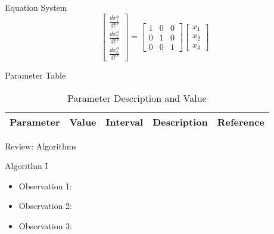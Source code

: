 \begin{frame}[t]
\begin{columns}[t]
\begin{column}{\onecolwid}
\begin{alertblock}{Equation System}
\begin{equation}
\begin{bmatrix} 
	\frac{dx_{1}^{\alpha}}{dt^{\alpha}}\\ 
	\frac{dx_{2}^{\alpha}}{dt^{\alpha}}\\ 
	\frac{dx_{3}^{\alpha}}{dt^{\alpha}}
\end{bmatrix} = 
\begin{bmatrix}
1 & 0 & 0\\ 
0 & 1 & 0\\ 
0 & 0 & 1
\end{bmatrix} 
\begin{bmatrix} 
	x_{1}\\ 
	x_{2}\\ 
	x_{3}
\end{bmatrix}
\end{equation}


\end{alertblock}
\begin{alertblock}{Parameter Table}

\vspace{4pt}
\centering
\begin{table}[h]\footnotesize
	\caption{Parameter Description and Value}
	\begin{tabular}{rllp{2cm}l}
		\hline	
		Parameter & Value & Interval & Description & Reference \\
		\hline 
	\end{tabular}	
\end{table}

\end{alertblock}
\begin{alertblock}{Review: Algorithms}
\begin{algorithm}[H]
	\begin{algorithmic}[1]
	\end{algorithmic}
\caption{Algorithm I}
\label{Algorithm_1}
\end{algorithm}
\begin{itemize}
	\item Observation 1: \\
	\item Observation 2:  \\
	\item Observation 3:  \\
\end{itemize}	


\end{alertblock}
\end{column}
\end{columns}
\end{frame}
